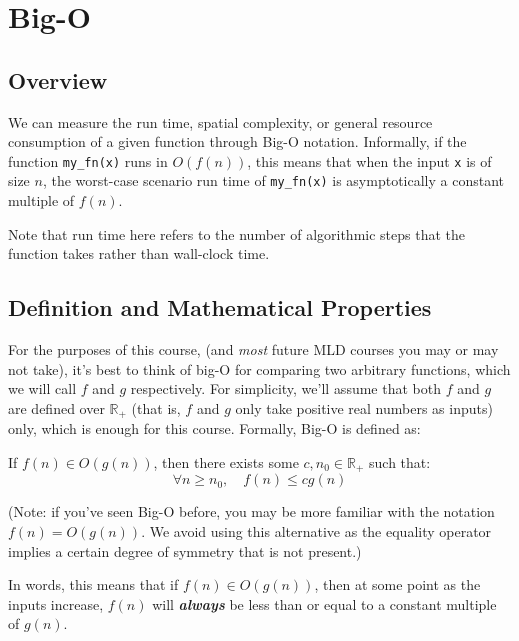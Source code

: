 \chapter{Big-O}
\label{ch:bigO}

\section{Overview}\label{sec:bigO::ovrvw}
We can measure the run time, spatial complexity, or general resource consumption of a given function through Big-O notation. Informally, if the function \texttt{my\_fn(x)} runs in $O(f(n))$, this means that when the input \texttt{x} is of size $n$, the worst-case scenario run time of \texttt{my\_fn(x)} is asymptotically a constant multiple of $f(n)$.

Note that run time here refers to the number of algorithmic steps that the function takes rather than wall-clock time. 

\section{Definition and Mathematical Properties}\label{sec:bigO::math}
For the purposes of this course, (and \emph{most} future MLD courses you may or may not take), it's best to think of big-O for comparing two arbitrary functions, which we will call $f$ and $g$ respectively. For simplicity, we'll assume that both $f$ and $g$ are defined over $\mathbb{R}_+$ (that is, $f$ and $g$ only take positive real numbers as inputs) only, which is enough for this course. Formally, Big-O is defined as:
\begin{definition}\label{def:bigO::bigO}
    If $f(n) \in O(g(n))$, then there exists some $c, n_0 \in \mathbb{R}_+$ such that:
    \[    \forall n \ge n_0, \quad f(n) \le c g(n)\]
\end{definition}
%

(Note: if you've seen Big-O before, you may be more familiar with the notation $f(n) = O(g(n))$. We avoid using this alternative as the equality operator implies a certain degree of symmetry that is not present.)

In words, this means that if $f(n) \in O(g(n))$, then at some point as the inputs increase, $f(n)$ will \emph{\textbf{always}} be less than or equal to a constant multiple of $g(n)$. 

